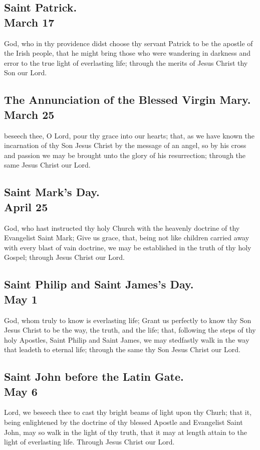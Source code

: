 \subsection{Saint Patrick.\\
March 17}
 God, who in thy providence didst choose thy servant Patrick to be the apostle of the Irish people, that he might bring those who were wandering in darkness and error to the true light of everlasting life; through the merits of Jesus Christ thy Son our Lord.

\subsection{The Annunciation of the Blessed Virgin Mary.\\
March 25}
 beseech thee, O Lord, pour thy grace into our hearts; that, as we have known the incarnation of thy Son Jesus Christ by the message of an angel, so by his cross and passion we may be brought unto the glory of his resurrection; through the same Jesus Christ our Lord.

\subsection{Saint Mark's Day.\\
April 25}
 God, who hast instructed thy holy Church with the heavenly doctrine of thy Evangelist Saint Mark; Give us grace, that, being not like children carried away with every blast of vain doctrine, we may be established in the truth of thy holy Gospel; through Jesus Christ our Lord.

\subsection{Saint Philip and Saint James's Day.\\
May 1}
 God, whom truly to know is everlasting life; Grant us perfectly to know thy Son Jesus Christ to be the way, the truth, and the life; that, following the steps of thy holy Apostles, Saint Philip and Saint James, we may stedfastly walk in the way that leadeth to eternal life; through the same thy Son Jesus Christ our Lord.

\subsection{Saint John before the Latin Gate.\\
May 6}
 Lord, we beseech thee to cast thy bright beams of light upon thy Churh; that it, being enlightened by the doctrine of thy blessed Apostle and Evangelist Saint John, may so walk in the light of thy truth, that it may at length attain to the light of everlasting life. Through Jesus Christ our Lord.


